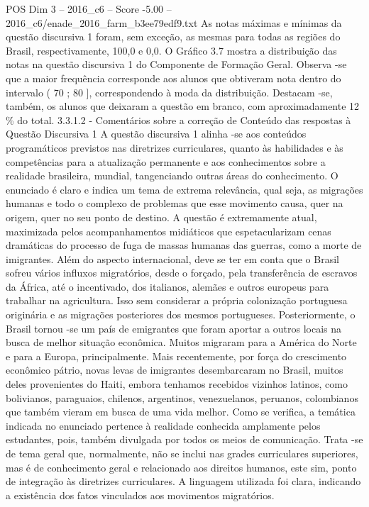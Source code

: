 \begin{textsample}{POS Dim 3 – 2016\_c6 – Score -5.00 – 2016\_c6/enade\_2016\_farm\_b3ee79edf9.txt}
As notas máximas e mínimas da questão discursiva 1 foram, sem exceção, as mesmas para todas as regiões do Brasil, respectivamente, 100,0 e 0,0.
O Gráfico 3.7 mostra a distribuição das notas na questão discursiva 1 do Componente de Formação Geral.
Observa -se que a maior frequência corresponde aos alunos que obtiveram nota dentro do intervalo ( 70 ; 80 ], correspondendo à moda da distribuição.
Destacam -se, também, os alunos que deixaram a questão em branco, com aproximadamente 12 \% do total. 3.3.1.2 - Comentários sobre a correção de Conteúdo das respostas à Questão Discursiva 1 A questão discursiva 1 alinha -se aos conteúdos programáticos previstos nas diretrizes curriculares, quanto às habilidades e às competências para a atualização permanente e aos conhecimentos sobre a realidade brasileira, mundial, tangenciando outras áreas do conhecimento.
O enunciado é claro e indica um tema de extrema relevância, qual seja, as migrações humanas e todo o complexo de problemas que esse movimento causa, quer na origem, quer no seu ponto de destino.
A questão é extremamente atual, maximizada pelos acompanhamentos midiáticos que espetacularizam cenas dramáticas do processo de fuga de massas humanas das guerras, como a morte de imigrantes.
Além do aspecto internacional, deve se ter em conta que o Brasil sofreu vários influxos migratórios, desde o forçado, pela transferência de escravos da África, até o incentivado, dos italianos, alemães e outros europeus para trabalhar na agricultura.
Isso sem considerar a própria colonização portuguesa originária e as migrações posteriores dos mesmos portugueses.
Posteriormente, o Brasil tornou -se um país de emigrantes que foram aportar a outros locais na busca de melhor situação econômica.
Muitos migraram para a América do Norte e para a Europa, principalmente.
Mais recentemente, por força do crescimento econômico pátrio, novas levas de imigrantes desembarcaram no Brasil, muitos deles provenientes do Haiti, embora tenhamos recebidos vizinhos latinos, como bolivianos, paraguaios, chilenos, argentinos, venezuelanos, peruanos, colombianos que também vieram em busca de uma vida melhor.
Como se verifica, a temática indicada no enunciado pertence à realidade conhecida amplamente pelos estudantes, pois, também divulgada por todos os meios de comunicação.
Trata -se de tema geral que, normalmente, não se inclui nas grades curriculares superiores, mas é de conhecimento geral e relacionado aos direitos humanos, este sim, ponto de integração às diretrizes curriculares.
A linguagem utilizada foi clara, indicando a existência dos fatos vinculados aos movimentos migratórios.

\end{textsample}
